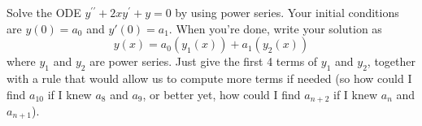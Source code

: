 \begin{problem}
 Solve the ODE $y^{\prime\prime}+2xy^\prime+y=0$ by using power series. Your initial conditions are $y(0)=a_0$ and $y'(0)=a_1$. When you're done, write your solution as
 $$y(x) =a_0 (y_1(x))+a_1(y_2(x))$$ where $y_1$ and $y_2$ are power series. Just give the first 4 terms of $y_1$ and $y_2$, together with a rule that would allow us to compute more terms if needed (so how could I find $a_{10}$ if I knew $a_8$ and $a_9$, or better yet, how could I find $a_{n+2}$ if I knew $a_n$ and $a_{n+1}$). 
\end{problem}


% 

